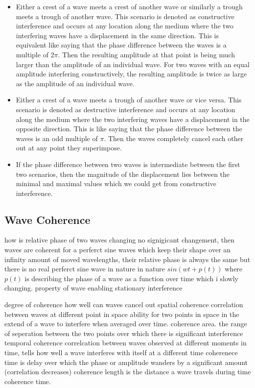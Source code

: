 \begin{itemize}
  \item Either a crest of a wave meets a crest of another wave or similarly a trough meets a trough of another wave. This scenario is denoted as constructive interference and occurs at any location along the medium where the two interfering waves have a displacement in the same direction. This is equivalent like saying that the phase difference between the waves is a multiple of $2\pi$. Then the resulting amplitude at that point is being much larger than the amplitude of an individual wave. For two waves with an equal amplitude interfering constructively, the resulting amplitude is twice as large as the amplitude of an individual wave.
  \item Either a crest of a wave meets a trough of another wave or vice versa. This scenario is denoted as destructive interference and occurs at any location along the medium where the two interfering waves have a displacement in the opposite direction. This is like saying that the phase difference between the waves is an odd multiple of $\pi$. Then the waves completely cancel each other out at any point they superimpose.
  \item If the phase difference between two waves is intermediate between the first two scenarios, then the magnitude of the displacement lies between the minimal and maximal values which we could get from constructive interference.
\end{itemize}

\subsection{Wave Coherence}

how is relative phase of two waves changing
no signigicant changement, then waves are coherent
for a perferct sine waves which keep their shape over an infinity amount of moved wavelengths, their relative phase is always the same
but there is no real perferct sine wave in nature
in nature $sin(wt + p(t))$ where $p(t)$ is describing the phase of a wave as a function over time which i slowly changing.
property of wave enabling stationary interference

degree of coherence how well can waves cancel out
spatial coherence
correlation between waves at different point in space
ability for two points in space in the extend of a wave to interfere when averaged over time.
coherence area. the range of seperation between the two points over which there is significant interference
temporal coherence correlcation between waves observed at different moments in time, tells how well a wave interferes with itself at a different time
coherenece time is delay over which the phase or amplitude wanders by a significant amount (correlation decreases)
coherence length is the distance a wave travels during time coherence time.

